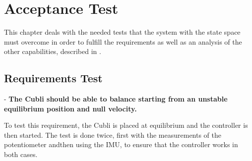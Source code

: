 \chapter{Acceptance Test}
This chapter deals with the needed tests that the system with the state space must overcome in order to fulfill the requirements as well as an analysis of the other capabilities, described in .

\section{Requirements Test}

- \textbf{The Cubli should be able to balance starting from an unstable equilibrium position and null velocity.}

To test this requirement, the Cubli is placed at equilibrium and the controller is then started. The test is done twice, first with the measurements of the potentiometer andthen using the IMU, to ensure that the controller works in both cases.

